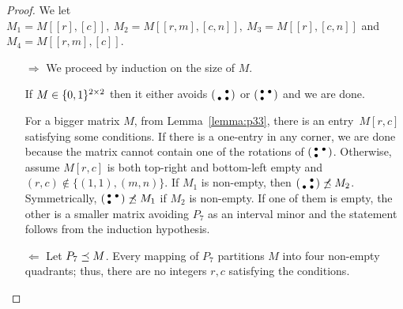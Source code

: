 \begin{proof}
We let $M_1=M[[r],[c]],\ M_2=M[[r,m],[c,n]],\ M_3=M[[r],[c,n]]$ and $M_4=M[[r,m],[c]]$.
\begin{itemize}
	\item[$\Rightarrow$] We proceed by induction on the size of $M$.

If $M\in\{0,1\}^{2\times2}$ then it either avoids $\left(\begin{smallmatrix} &\bullet\\\bullet&\bullet\end{smallmatrix}\right)$ or $\left(\begin{smallmatrix}\bullet&\bullet\\\bullet& \end{smallmatrix}\right)$ and we are done.

For a bigger matrix $M$, from Lemma~\ref{lemma:p33}, there is an entry~$M[r,c]$ satisfying some conditions. If there is a one-entry in any corner, we are done because the matrix cannot contain one of the rotations of $\left(\begin{smallmatrix}\bullet&\bullet\\\bullet& \end{smallmatrix}\right)$. Otherwise, assume $M[r,c]$ is both top-right and bottom-left empty and $(r,c)\not\in\{(1,1),(m,n)\}$. If $M_1$ is non-empty, then $\left(\begin{smallmatrix} &\bullet\\\bullet&\bullet\end{smallmatrix}\right)\not\preceq M_2$. Symmetrically, $\left(\begin{smallmatrix}\bullet&\bullet\\\bullet& \end{smallmatrix}\right)\not\preceq M_1$ if $M_2$ is non-empty. If one of them is empty, the other is a smaller matrix avoiding $P_7$ as an interval minor and the statement follows from the induction hypothesis.
	\item[$\Leftarrow$] Let $P_7\preceq M$. Every mapping of $P_7$ partitions $M$ into four non-empty quadrants; thus, there are no integers $r,c$ satisfying the conditions. \qedhere
\end{itemize}
\end{proof}

